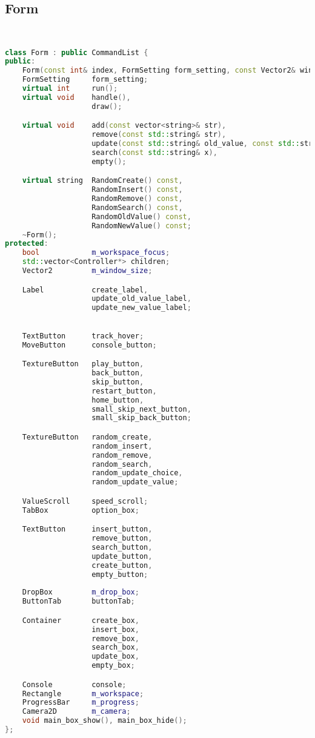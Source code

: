 \subsection{Form}
\begin{lstlisting}[language=C++]


class Form : public CommandList {
public:
    Form(const int& index, FormSetting form_setting, const Vector2& window_size);
    FormSetting     form_setting;
    virtual int     run();
    virtual void    handle(),
                    draw();

    virtual void    add(const vector<string>& str),
                    remove(const std::string& str),
                    update(const std::string& old_value, const std::string& new_value),
                    search(const std::string& x),
                    empty();

    virtual string  RandomCreate() const,
                    RandomInsert() const,
                    RandomRemove() const,
                    RandomSearch() const,
                    RandomOldValue() const,
                    RandomNewValue() const;
    ~Form();
protected:
    bool            m_workspace_focus;
    std::vector<Controller*> children;
    Vector2         m_window_size;

    Label           create_label,
                    update_old_value_label,
                    update_new_value_label;
    

    TextButton      track_hover;
    MoveButton      console_button;

    TextureButton   play_button,
                    back_button,
                    skip_button,
                    restart_button,
                    home_button,
                    small_skip_next_button,
                    small_skip_back_button;

    TextureButton   random_create,
                    random_insert,
                    random_remove,
                    random_search,
                    random_update_choice,
                    random_update_value;

    ValueScroll     speed_scroll;
    TabBox          option_box;

    TextButton      insert_button,
                    remove_button,
                    search_button,
                    update_button,
                    create_button,
                    empty_button;
    
    DropBox         m_drop_box;
    ButtonTab       buttonTab;

    Container       create_box,
                    insert_box,
                    remove_box,
                    search_box,
                    update_box,
                    empty_box;

    Console         console;
    Rectangle       m_workspace;
    ProgressBar     m_progress;
    Camera2D        m_camera;
    void main_box_show(), main_box_hide();
};






\end{lstlisting}

